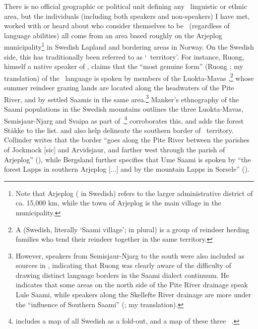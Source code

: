 There is no official geographic or political unit defining any \PS\ linguistic or ethnic area, but the individuals (including both speakers and non-speakers) I have met, worked with or heard about who consider themselves to be \PS\ (regardless of language abilities) all come from an area based roughly on the Arjeplog municipality\footnote{Note that Arjeplog  ( in Swedish) refers to the larger administrative district of ca. 15,000 km, while the town of Arjeplog is the main village in the municipality.} 
in Swedish Lapland and bordering areas in Norway. On the Swedish side, this has traditionally been referred to as  ‘\PS\ territory’. 
For instance, Ruong, himself a native speaker of \PS, claims that the “most genuine form” (Ruong \citeyear[iii]{Ruong1943}; my translation) of the \PS\ language is spoken by members of the Luokta-Mavas ,\footnote{A  (Swedish, literally ‘Saami village’;  in plural) is a group of reindeer herding families who tend their reindeer together in the same territory.} 
whose summer reindeer grazing lands are located along the headwaters of the Pite River, and by settled Saamis in the same area.\footnote{However, speakers from Semisjaur-Njarg  to the south were also included as sources in \cite{Ruong1945}, indicating that Ruong was clearly aware of the difficulty of drawing distinct language borders in the Saami dialect continuum. He indicates that some areas on the north side of the Pite River drainage speak Lule Saami, while speakers along the Skellefte River drainage are more under the “influence of Southern Saami” (\citealt[iii]{Ruong1945}; my translation).} 
Manker’s ethnography of the Saami populations in the Swedish mountains \citep{Manker1947} outlines the three  Luokta-Mavas, Semisjaur-Njarg and Svaipa as part of .\footnote{\citet[473]{Manker1947} includes a map of all Swedish  as a fold-out, and a map of these three \PS\ .} 
\citet[22]{Sammallahti1998} corroborates this, and adds the forest  Ståkke to the list. \citeauthor{Collinder1960} and \citeauthor{Bergsland1962} also help delineate the southern border of \PS\ territory. Collinder writes that the border “goes along the Pite River between the parishes of Jockmock [sic] and Arvidsjaur, and farther west through the parish of Arjeplog” (\citeyear[23]{Collinder1960}), while Bergsland further specifies that Ume Saami is spoken by “the forest Lapps in southern Arjeplog [...] and by the mountain Lapps in Sorsele” (\citeyear[27]{Bergsland1962}). %


